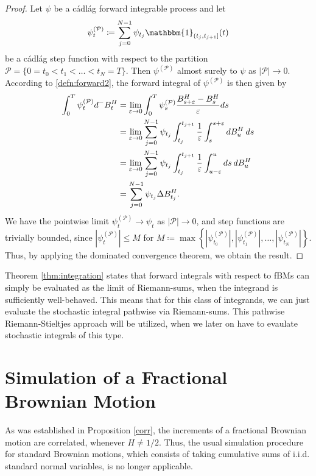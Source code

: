 \begin{proof}
    Let $\psi$ be a cádlág forward integrable process and let
    \begin{equation}
        \psi^{(\mathcal{P})}_{t}\coloneqq \sum_{j=0}^{N-1}\psi_{t_{j}}\mathbbm{1}_{(t_{j},t_{j+1}]}(t)
    \end{equation}
    be a cádlág step function with respect to the partition $\mathcal{P}=\{0=t_{0}<t_{1}<\dots <t_{N}=T\}$. Then $\psi^{(\mathcal{P})}$ almost surely to $\psi$ as $|\mathcal{P}|\to 0$. According to \eqref{defn:forward2}, the forward integral of $\psi^{(\mathcal{P})}$ is then given by
    \begin{align}
        \int_{0}^{T}\psi^{(\mathcal{P})}_{t}d^{-}B^{H}_{t}&=\lim_{\varepsilon\to 0}\int_{0}^{T}\psi^{(\mathcal{P})}_{s}\frac{B^{H}_{s+\varepsilon}-B_{s}^{H}}{\varepsilon}ds\\
        &= \lim_{\varepsilon\to 0}\sum_{j=0}^{N-1}\psi_{t_{j}}\int_{t_{j}}^{t_{j+1}}\frac{1}{\varepsilon}\int_{s}^{s+\varepsilon}dB_{u}^{H}\hspace{2 pt}ds\\
        &= \lim_{\varepsilon\to 0}\sum_{j=0}^{N-1}\psi_{t_{j}}\int_{t_{j}}^{t_{j+1}}\frac{1}{\varepsilon}\int_{u-\varepsilon}^{u}ds\hspace{2 pt}dB_{u}^{H}\\
        &= \sum_{j=0}^{N-1}\psi_{t_{j}}\Delta B_{t_{j}}^{H}.
    \end{align}
We have the pointwise limit $\psi^{(\mathcal{P})}_{t}\to\psi_{t}$ as $|\mathcal{P}|\to 0$, and step functions are trivially bounded, since $|\psi^{(\mathcal{P})}_{t}|\leq M$ for $M\coloneqq \max\left\{|\psi^{(\mathcal{P})}_{t_{0}}|, |\psi^{(\mathcal{P})}_{t_{1}}|,\dots,|\psi^{(\mathcal{P})}_{t_{N}}|\right\}$. Thus, by applying the dominated convergence theorem, we obtain the result.
\end{proof}
Theorem \ref{thm:integration} states that forward integrals with respect to fBMs can simply be evaluated as the limit of Riemann-sums, when the integrand is sufficiently well-behaved. This means that for this class of integrands, we can just evaluate the stochastic integral pathwise via Riemann-sums. This pathwise Riemann-Stieltjes approach will be utilized, when we later on have to evaulate stochastic integrals of this type. 
\section{Simulation of a Fractional Brownian Motion}
As was established in Proposition \ref{corr}, the increments of a fractional Brownian motion are correlated, whenever $H\neq 1/2$. Thus, the usual simulation procedure for standard Brownian motions, which consists of taking cumulative sums of i.i.d. standard normal variables, is no longer applicable. 

